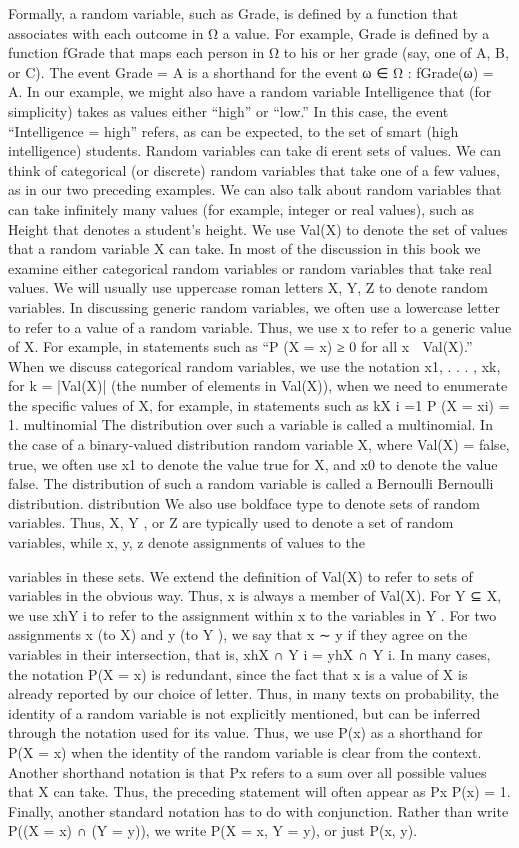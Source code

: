 Formally, a random variable, such as Grade, is defined by a function that associates with each outcome in Ω a value. For example, Grade is defined by a function fGrade that maps each person in Ω to his or her grade (say, one of A, B, or C). The event Grade = A is a shorthand for the event {ω ∈ Ω : fGrade(ω) = A}. In our example, we might also have a random variable Intelligence that (for simplicity) takes as values either “high” or “low.” In this case, the event “Intelligence = high” refers, as can be expected, to the set of smart (high intelligence) students. Random variables can take dierent sets of values. We can think of categorical (or discrete) random variables that take one of a few values, as in our two preceding examples. We can also talk about random variables that can take infinitely many values (for example, integer or real values), such as Height that denotes a student’s height. We use Val(X) to denote the set of values that a random variable X can take. In most of the discussion in this book we examine either categorical random variables or random variables that take real values. We will usually use uppercase roman letters X, Y, Z to denote random variables. In discussing generic random variables, we often use a lowercase letter to refer to a value of a random variable. Thus, we use x to refer to a generic value of X. For example, in statements such as “P (X = x) ≥ 0 for all x ∈ Val(X).” When we discuss categorical random variables, we use the notation x1, . . . , xk, for k = |Val(X)| (the number of elements in Val(X)), when we need to enumerate the specific values of X, for example, in statements such as kX i =1 P (X = xi) = 1. multinomial The distribution over such a variable is called a multinomial. In the case of a binary-valued distribution random variable X, where Val(X) = {false, true}, we often use x1 to denote the value true for X, and x0 to denote the value false. The distribution of such a random variable is called a Bernoulli Bernoulli distribution. distribution We also use boldface type to denote sets of random variables. Thus, X, Y , or Z are typically used to denote a set of random variables, while x, y, z denote assignments of values to the

variables in these sets. We extend the definition of Val(X) to refer to sets of variables in the obvious way. Thus, x is always a member of Val(X). For Y ⊆ X, we use xhY i to refer to the assignment within x to the variables in Y . For two assignments x (to X) and y (to Y ), we say that x ∼ y if they agree on the variables in their intersection, that is, xhX ∩ Y i = yhX ∩ Y i. In many cases, the notation P(X = x) is redundant, since the fact that x is a value of X is already reported by our choice of letter. Thus, in many texts on probability, the identity of a random variable is not explicitly mentioned, but can be inferred through the notation used for its value. Thus, we use P(x) as a shorthand for P(X = x) when the identity of the random variable is clear from the context. Another shorthand notation is that Px refers to a sum over all possible values that X can take. Thus, the preceding statement will often appear as Px P(x) = 1. Finally, another standard notation has to do with conjunction. Rather than write P((X = x) ∩ (Y = y)), we write P(X = x, Y = y), or just P(x, y).

